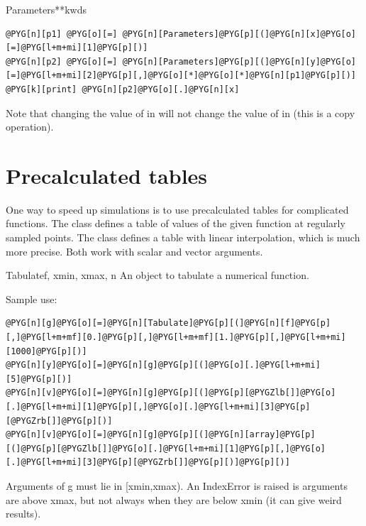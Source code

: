 \documentclass[letterpaper,10pt,english]{manual}
\begin{document}
\begin{classdesc}{Parameters}{**kwds}
\begin{Verbatim}[commandchars=@\[\]]
@PYG[n][p1] @PYG[o][=] @PYG[n][Parameters]@PYG[p][(]@PYG[n][x]@PYG[o][=]@PYG[l+m+mi][1]@PYG[p][)]
@PYG[n][p2] @PYG[o][=] @PYG[n][Parameters]@PYG[p][(]@PYG[n][y]@PYG[o][=]@PYG[l+m+mi][2]@PYG[p][,]@PYG[o][*]@PYG[o][*]@PYG[n][p1]@PYG[p][)]
@PYG[k][print] @PYG[n][p2]@PYG[o][.]@PYG[n][x]
\end{Verbatim}

Note that changing the value of  in  will not change the value of  in  (this
is a copy operation).
\end{classdesc}

\resetcurrentobjects
\hypertarget{--doc-tabulate}{}

\section{Precalculated tables}

One way to speed up simulations is to use precalculated tables for complicated
functions. The \hyperlink{brian.Tabulate}{} class defines a table of values of the
given function at regularly sampled points. The \hyperlink{brian.TabulateInterp}{} class
defines a table with linear interpolation, which is much more precise. Both work
with scalar and vector arguments.

\hypertarget{brian.Tabulate}{}\begin{classdesc}{Tabulate}{f, xmin, xmax, n}
An object to tabulate a numerical function.

Sample use:

\begin{Verbatim}[commandchars=@\[\]]
@PYG[n][g]@PYG[o][=]@PYG[n][Tabulate]@PYG[p][(]@PYG[n][f]@PYG[p][,]@PYG[l+m+mf][0.]@PYG[p][,]@PYG[l+m+mf][1.]@PYG[p][,]@PYG[l+m+mi][1000]@PYG[p][)]
@PYG[n][y]@PYG[o][=]@PYG[n][g]@PYG[p][(]@PYG[o][.]@PYG[l+m+mi][5]@PYG[p][)]
@PYG[n][v]@PYG[o][=]@PYG[n][g]@PYG[p][(]@PYG[p][@PYGZlb[]]@PYG[o][.]@PYG[l+m+mi][1]@PYG[p][,]@PYG[o][.]@PYG[l+m+mi][3]@PYG[p][@PYGZrb[]]@PYG[p][)]
@PYG[n][v]@PYG[o][=]@PYG[n][g]@PYG[p][(]@PYG[n][array]@PYG[p][(]@PYG[p][@PYGZlb[]]@PYG[o][.]@PYG[l+m+mi][1]@PYG[p][,]@PYG[o][.]@PYG[l+m+mi][3]@PYG[p][@PYGZrb[]]@PYG[p][)]@PYG[p][)]
\end{Verbatim}

Arguments of g must lie in {[}xmin,xmax).
An IndexError is raised is arguments are above xmax, but
not always when they are below xmin (it can give weird results).
\end{classdesc}
\end{document}
